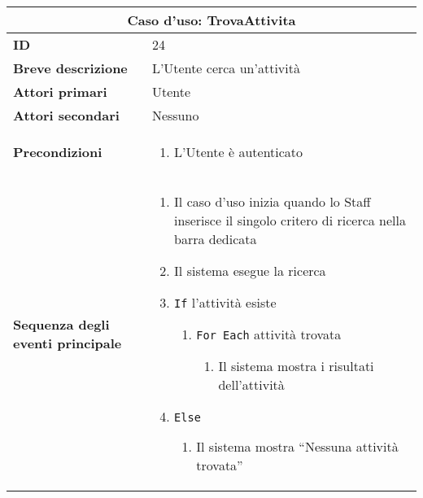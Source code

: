 \documentclass[a4paper]{report}
\begin{document}
\clearpage
\begin{table}[H]
\vspace*{-0cm}
\renewcommand{\arraystretch}{1.9}
\begin{tabular}{|p{3.9cm}|p{9.9cm}|}
\hline
\multicolumn{2}{|c|}{\textbf{Caso d’uso: TrovaAttivita}} \\ \hline
	\textbf{ID} & 24 \\ \hline
	\textbf{Breve descrizione} & L'Utente cerca un’attività \\ \hline
	\textbf{Attori primari} & Utente \\ \hline
	\textbf{Attori secondari} & Nessuno \\ \hline
	\textbf{Precondizioni} & \begin{enumerate}[leftmargin=14pt,label=\arabic*.,labelsep=0.5em,topsep=0pt,partopsep=0pt,parsep=0pt,itemsep=0pt]
    \item L'Utente è autenticato
\end{enumerate} \\ \hline
	\textbf{Sequenza degli eventi principale} & \begin{enumerate}[leftmargin=14pt,label=\arabic*.,labelsep=0.5em,topsep=0pt,partopsep=0pt,parsep=0pt,itemsep=0pt]
    \item Il caso d’uso inizia quando lo Staff inserisce il singolo critero di ricerca nella barra dedicata 
    \item Il sistema esegue la ricerca
    \item \texttt{If} l’attività esiste
    \begin{enumerate}[label=\arabic{enumi}.\arabic*.,leftmargin=22pt,labelsep=0.5em,topsep=0pt,partopsep=0pt,parsep=0pt,itemsep=0pt]
        \item \texttt{For Each} attività trovata
        \begin{enumerate}[label=\arabic{enumi}.\arabic{enumii}.\arabic*.,leftmargin=22pt,labelsep=0.5em,topsep=0pt,partopsep=0pt,parsep=0pt,itemsep=0pt]
            \item Il sistema mostra i risultati dell'attività
        \end{enumerate}
    \end{enumerate}
    \item \texttt{Else}
    \begin{enumerate}[label=\arabic{enumi}.\arabic*.,leftmargin=22pt,labelsep=0.5em,topsep=0pt,partopsep=0pt,parsep=0pt,itemsep=0pt]
        \item Il sistema mostra “Nessuna attività trovata”
    \end{enumerate}

\end{enumerate}
\end{tabular}
\end{table}
\end{document}
